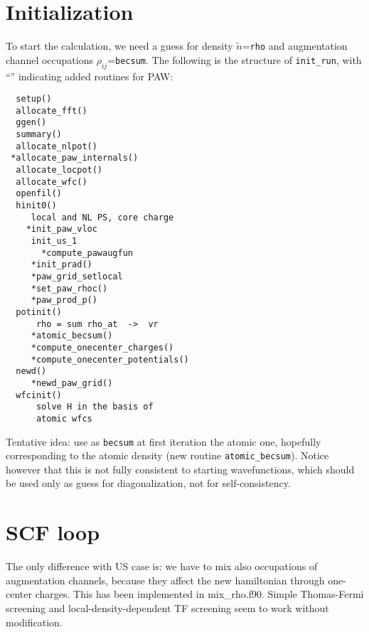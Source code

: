 \documentclass[a4paper,twocolumn,12pt]{article}
\newcommand{\var}[1]{{\tt #1}}
\begin{document}

\section*{Initialization}

To start the calculation, we need a guess for density
$\tilde{n}$=\var{rho} and augmentation channel occupations
$\rho_{ij}$=\var{becsum}.  The following is the structure of
\var{init\_run}, with ``\var{*}'' indicating added routines for PAW:
\begin{verbatim}
  setup()
  allocate_fft()
  ggen()
  summary()
  allocate_nlpot()
 *allocate_paw_internals()
  allocate_locpot()
  allocate_wfc()
  openfil()
  hinit0()
     local and NL PS, core charge
    *init_paw_vloc
     init_us_1
       *compute_pawaugfun
     *init_prad()
     *paw_grid_setlocal
     *set_paw_rhoc()
     *paw_prod_p()
  potinit()
      rho = sum rho_at  ->  vr
     *atomic_becsum()
     *compute_onecenter_charges()
     *compute_onecenter_potentials()
  newd()
     *newd_paw_grid()
  wfcinit()
      solve H in the basis of
      atomic wfcs
\end{verbatim}
Tentative idea: use as \var{becsum} at first iteration the atomic one,
hopefully corresponding to the atomic density (new routine
\var{atomic\_becsum}).  Notice however that this is not fully consistent
to starting wavefunctions, which should be used only as guess for
diagonalization, not for self-consistency.

\section*{SCF loop}

The only difference with US case is: we have to mix also occupations
of augmentation channels, because they affect the new hamiltonian
through one-center charges. This has been implemented in 
mix\_rho.f90. Simple Thomas-Fermi screening and local-density-dependent 
TF screening seem to work without modification.
\end{document}

